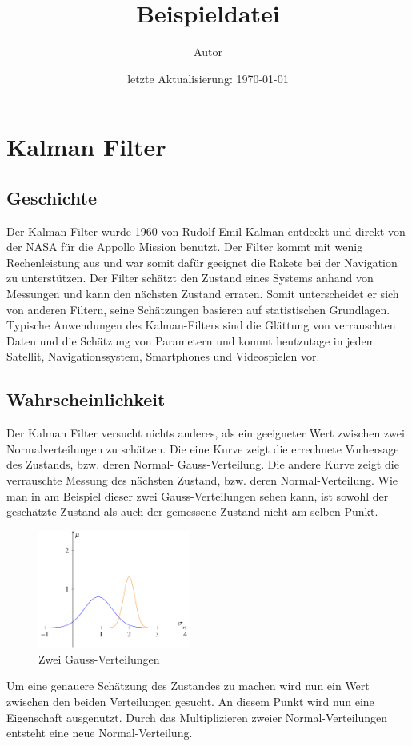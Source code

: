 \documentclass[11pt,a4paper]{article}
\title{\bf {Beispieldatei}}
\author{\vspace{2cm}
  Autor}
\date{\vspace{3cm} %
      letzte Aktualisierung: \today}
\begin{document}
\section{Kalman Filter}
\subsection{Geschichte}
Der Kalman Filter wurde 1960 von Rudolf Emil Kalman entdeckt und direkt von der NASA für die Appollo Mission benutzt. Der Filter kommt mit wenig Rechenleistung aus und war somit dafür geeignet die Rakete bei der Navigation zu unterstützen. Der Filter schätzt den Zustand eines Systems anhand von Messungen und kann den nächsten Zustand erraten. Somit unterscheidet er sich von anderen Filtern, seine Schätzungen basieren auf statistischen Grundlagen. Typische Anwendungen des Kalman-Filters sind die Glättung von verrauschten Daten und die Schätzung von Parametern und kommt heutzutage in jedem Satellit, Navigationssystem, Smartphones und Videospielen vor.

\subsection{Wahrscheinlichkeit}
Der Kalman Filter versucht nichts anderes, als ein geeigneter Wert zwischen zwei Normalverteilungen zu schätzen. Die eine Kurve zeigt die errechnete Vorhersage des Zustands, bzw. deren Normal- Gauss-Verteilung. Die andere Kurve zeigt die verrauschte Messung des nächsten Zustand, bzw. deren Normal-Verteilung. Wie man in am Beispiel dieser zwei Gauss-Verteilungen sehen kann, ist sowohl der geschätzte Zustand als auch der gemessene Zustand nicht am selben Punkt. 

\begin{figure}[h]
 \begin{center}
 \includegraphics[width=5cm]{Gausskurve2}
 \caption{Zwei Gauss-Verteilungen}
 \end{center}
\end{figure}
Um eine genauere Schätzung des Zustandes zu machen wird nun ein Wert zwischen den beiden Verteilungen gesucht. An diesem Punkt wird nun eine Eigenschaft ausgenutzt. Durch das Multiplizieren zweier Normal-Verteilungen entsteht eine neue Normal-Verteilung. 
\end{document}
